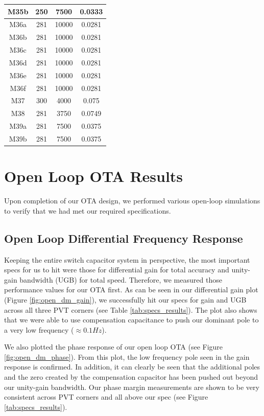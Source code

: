 \documentclass[journal]{IEEEtran}
\begin{document}
\begin{table}
\begin{tabular}{|c|c|c|c|}
\hline M35b & 250 & 7500 & 0.0333  \\
\hline M36a & 281 & 10000 & 0.0281 \\
\hline M36b & 281 & 10000 & 0.0281 \\
\hline M36c & 281 & 10000 & 0.0281 \\
\hline M36d & 281 & 10000 & 0.0281 \\
\hline M36e & 281 & 10000 & 0.0281 \\
\hline M36f & 281 & 10000 & 0.0281 \\
\hline M37 & 300 & 4000 & 0.075 \\
\hline M38 & 281 & 3750 & 0.0749 \\
\hline M39a & 281 & 7500 & 0.0375 \\
\hline M39b & 281 & 7500 & 0.0375 \\
\hline 
\end{tabular} 
\end{table}

\section{Open Loop OTA Results}
Upon completion of our OTA design, we performed various open-loop simulations to verify that we had met our required specifications.

\subsection{Open Loop Differential Frequency Response}
Keeping the entire switch capacitor system in perspective, the most important specs for us to hit were those for differential gain for total accuracy and unity-gain bandwidth (UGB) for total speed. Therefore, we measured those performance values for our OTA first. As can be seen in our differential gain plot (Figure \ref{fig:open_dm_gain}), we successfully hit our specs for gain and UGB across all three PVT corners (see Table \ref{tab:specs_results}). The plot also shows that we were able to use compensation capacitance to push our dominant pole to a very low frequency ($\approx 0.1 Hz$).

We also plotted the phase response of our open loop OTA (see Figure \ref{fig:open_dm_phase}). From this plot, the low frequency pole seen in the gain response is confirmed. In addition, it can clearly be seen that the additional poles and the zero created by the compensation capacitor has been pushed out beyond our unity-gain bandwidth. Our phase margin measurements are shown to be very consistent across PVT corners and all above our spec (see Figure \ref{tab:specs_results}).
\end{document}
